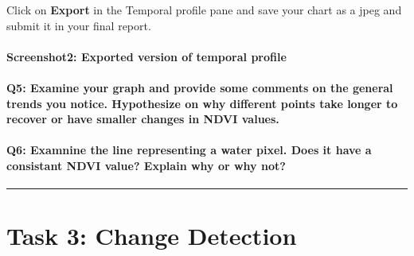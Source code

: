 \documentclass[
]{book}
\begin{document}
Click on \textbf{Export} in the Temporal profile pane and save your chart as a jpeg and submit it in your final report.

\hypertarget{screenshot2-exported-version-of-temporal-profile}{%
\paragraph*{Screenshot2: Exported version of temporal profile}\label{screenshot2-exported-version-of-temporal-profile}}

\hypertarget{q5-examine-your-graph-and-provide-some-comments-on-the-general-trends-you-notice.-hypothesize-on-why-different-points-take-longer-to-recover-or-have-smaller-changes-in-ndvi-values.}{%
\paragraph*{Q5: Examine your graph and provide some comments on the general trends you notice. Hypothesize on why different points take longer to recover or have smaller changes in NDVI values.}\label{q5-examine-your-graph-and-provide-some-comments-on-the-general-trends-you-notice.-hypothesize-on-why-different-points-take-longer-to-recover-or-have-smaller-changes-in-ndvi-values.}}

\hypertarget{q6-examnine-the-line-representing-a-water-pixel.-does-it-have-a-consistant-ndvi-value-explain-why-or-why-not}{%
\paragraph*{Q6: Examnine the line representing a water pixel. Does it have a consistant NDVI value? Explain why or why not?}\label{q6-examnine-the-line-representing-a-water-pixel.-does-it-have-a-consistant-ndvi-value-explain-why-or-why-not}}

\begin{center}\rule{0.5\linewidth}{0.5pt}\end{center}

\hypertarget{task-3-change-detection}{%
\section*{Task 3: Change Detection}\label{task-3-change-detection}}
\end{document}
